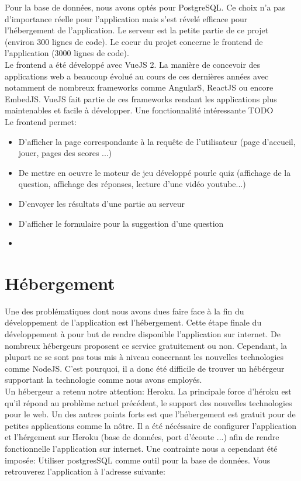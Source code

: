 \documentclass[a4paper,11pt, oneside]{book}
\begin{document}
\noindent Pour la base de données, nous avons optés pour PostgreSQL. Ce choix n'a pas d'importance réelle pour l'application mais s'est révelé efficace pour l'hébergement de l'application.
Le serveur est la petite partie de ce projet (environ 300 lignes de code). Le coeur du projet concerne le frontend de l'application (3000 lignes de code).\\

Le frontend a été développé avec VueJS 2. La manière de concevoir des applications web a beaucoup évolué au cours de ces dernières années avec notamment de nombreux frameworks comme AngularS, ReactJS ou encore EmbedJS. VueJS fait partie
de ces frameworks rendant les applications plus maintenables et facile à développer. Une fonctionnalité intéressante TODO\\

\noindent Le frontend permet:
\begin{itemize}
		\item D'afficher la page correspondante à la requête de l'utilisateur (page d'accueil, jouer, pages des scores ...)
		\item De mettre en oeuvre le moteur de jeu développé pourle quiz (affichage de la question, affichage des réponses, lecture d'une vidéo youtube...)
		\item D'envoyer les résultats d'une partie au serveur
		\item D'afficher le formulaire pour la suggestion d'une question
		\item
\end{itemize}
\section{Hébergement}

Une des problématiques dont nous avons dues faire face à la fin du développement de l'application est l'hébergement. Cette étape finale du développement à pour but de
rendre disponible l'application sur internet. De nombreux hébergeurs proposent ce service gratuitement ou non. Cependant, la plupart ne se sont pas tous mis à niveau concernant
les nouvelles technologies comme NodeJS. C'est pourquoi, il a donc été difficile de trouver un hébérgeur supportant la technologie comme nous avons employés.\\

Un hébergeur a retenu notre attention: Heroku. La principale force d'héroku est qu'il répond au problème actuel précédent, le support des nouvelles technologies pour le web.
Un des autres points forts est que l'hébergement est gratuit pour de petites applications comme la nôtre. Il a été nécéssaire de configurer l'application et l'hérgement sur Heroku (base de données, port d'écoute ...)
afin de rendre fonctionnelle l'application sur internet. Une contrainte nous a cependant été imposée: Utiliser postgresSQL comme outil pour la base de données. Vous retrouverez l'application à l'adresse suivante:
\end{document}
